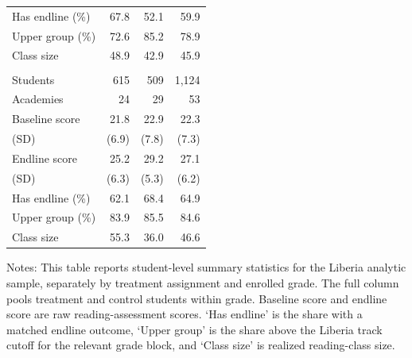 \begin{table}[htbp]
\begin{center}
\begin{small}
\begin{threeparttable}
\begin{tabular}{l*{3}{r}}
Has endline (\%) & 67.8 & 52.1 & 59.9 \\
Upper group (\%) & 72.6 & 85.2 & 78.9 \\
Class size & 48.9 & 42.9 & 45.9 \\
\addlinespace
\multicolumn{4}{l}{\textit{Grade 4}} \\
Students & 615 & 509 & 1,124 \\
Academies & 24 & 29 & 53 \\
Baseline score & 21.8 & 22.9 & 22.3 \\
\quad (SD) & (6.9) & (7.8) & (7.3) \\
Endline score & 25.2 & 29.2 & 27.1 \\
\quad (SD) & (6.3) & (5.3) & (6.2) \\
Has endline (\%) & 62.1 & 68.4 & 64.9 \\
Upper group (\%) & 83.9 & 85.5 & 84.6 \\
Class size & 55.3 & 36.0 & 46.6 \\
\bottomrule
\end{tabular}
\renewcommand{\arraystretch}{1}
\begin{tablenotes}
\footnotesize \item Notes: This table reports student-level summary statistics for the Liberia analytic sample, separately by treatment assignment and enrolled grade. The full column pools treatment and control students within grade. Baseline score and endline score are raw reading-assessment scores. `Has endline' is the share with a matched endline outcome, `Upper group' is the share above the Liberia track cutoff for the relevant grade block, and `Class size' is realized reading-class size.
\end{tablenotes}
\end{threeparttable}
\end{small}
\end{center}
\end{table}